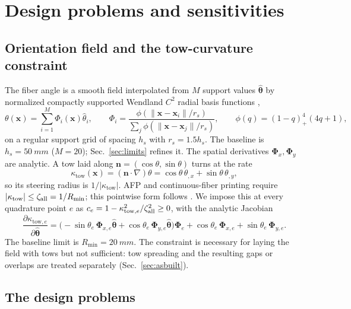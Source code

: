 \section{Design problems and sensitivities}\label{sec:design}

\subsection{Orientation field and the tow-curvature constraint}\label{sec:manuf}
The fiber angle is a smooth field interpolated from $M$ support values $\hat{\bm\theta}$
by normalized compactly supported Wendland $C^2$ radial basis functions \cite{wendland1995},
\begin{equation}
\theta(\bm x)=\sum_{i=1}^M\Phi_i(\bm x)\hat\theta_i,\qquad
\Phi_i=\frac{\phi(\|\bm x-\bm x_i\|/r_s)}{\sum_j\phi(\|\bm x-\bm x_j\|/r_s)},\qquad
\phi(q)=(1-q)_+^4(4q+1),
\label{eq:csrbf}
\end{equation}
on a regular support grid of spacing $h_s$ with $r_s=1.5h_s$. The baseline is
$h_s=\SI{50}{mm}$ ($M=20$); Sec.~\ref{sec:limits} refines it. The spatial derivatives
$\bm\Phi_x,\bm\Phi_y$ are analytic. A tow laid along $\bm n=(\cos\theta,\sin\theta)$
turns at the rate
\begin{equation}
\kappa_{\mathrm{tow}}(\bm x)=(\bm n\!\cdot\!\nabla)\theta=\cos\theta\,\theta_{,x}+\sin\theta\,\theta_{,y},
\label{eq:towcurv}
\end{equation}
so its steering radius is $1/|\kappa_{\mathrm{tow}}|$. AFP and continuous-fiber printing require
$|\kappa_{\mathrm{tow}}|\le\zeta_{\mathrm{all}}=1/R_{\min}$; this pointwise form follows \cite{wong2026}. We impose this at every quadrature point $e$
as $c_e=1-\kappa_{\mathrm{tow},e}^2/\zeta_{\mathrm{all}}^2\ge0$, with the analytic Jacobian
\begin{equation}
\frac{\partial\kappa_{\mathrm{tow},e}}{\partial\hat{\bm\theta}}=
\big(-\sin\theta_e\,\bm\Phi_{x,e}\hat{\bm\theta}+\cos\theta_e\,\bm\Phi_{y,e}\hat{\bm\theta}\big)\bm\Phi_e
+\cos\theta_e\,\bm\Phi_{x,e}+\sin\theta_e\,\bm\Phi_{y,e}.
\end{equation}
The baseline limit is $R_{\min}=\SI{20}{mm}$. The constraint is necessary for laying the field with
tows but not sufficient: tow spreading and the resulting gaps or overlaps are treated separately
(Sec.~\ref{sec:asbuilt}).

\subsection{The design problems}\label{sec:problems}

